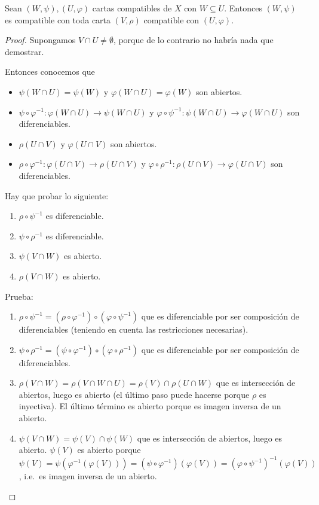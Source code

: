\documentclass[../VD.tex]{subfiles}
\begin{document}
\begin{lemma}
  \label{lem:compat-subcartas}
  Sean \((W,\psi), (U,\varphi)\) cartas compatibles de \(X\) con \(W \subseteq
  U\). Entonces \((W,\psi)\) es compatible con toda carta \((V,\rho)\)
  compatible con \((U,\varphi)\).
\end{lemma}

\begin{proof}
  Supongamos \(V \cap U \neq \emptyset\), porque de lo contrario no habría nada
  que demostrar.

  Entonces conocemos que
  \begin{itemize}
  \item \(\psi(W \cap U) = \psi(W)\) y \(\varphi(W \cap U) = \varphi(W)\) son
    abiertos.
  \item \(\psi \circ \varphi^{-1} \colon \varphi(W \cap U) \to \psi(W \cap U)\)
    y \(\varphi \circ \psi^{-1} \colon \psi(W \cap U) \to \varphi(W \cap U)\)
    son diferenciables.
  \item \(\rho(U \cap V)\) y \(\varphi(U \cap V)\) son abiertos.
  \item \(\rho \circ \varphi^{-1} \colon \varphi(U \cap V) \to \rho(U \cap V)\)
    y \(\varphi \circ \rho^{-1} \colon \rho(U \cap V) \to \varphi(U \cap V)\)
    son diferenciables.
  \end{itemize}

  Hay que probar lo siguiente:
  \begin{enumerate}
  \item \(\rho \circ \psi^{-1}\) es diferenciable.
  \item \(\psi \circ \rho^{-1}\) es diferenciable.
  \item \(\psi(V \cap W)\) es abierto.
  \item \(\rho(V \cap W)\) es abierto.
  \end{enumerate}

  Prueba:
  \begin{enumerate}
  \item \(\rho \circ \psi^{-1} = (\rho \circ \varphi^{-1}) \circ (\varphi \circ
    \psi^{-1})\) que es diferenciable por ser composición de diferenciables
    (teniendo en cuenta las restricciones necesarias).
  \item \(\psi \circ \rho^{-1} = (\psi \circ \varphi^{-1}) \circ (\varphi \circ
    \rho^{-1})\) que es diferenciable por ser composición de diferenciables.
  \item \(\rho(V \cap W) = \rho(V \cap W \cap U) = \rho(V) \cap \rho(U \cap W)\)
    que es intersección de abiertos, luego es abierto (el último paso puede
    hacerse porque \(\rho\) es inyectiva). El último término es abierto porque
    es imagen inversa de un abierto.
  \item \(\psi(V \cap W) = \psi(V) \cap \psi(W)\) que es intersección de
    abiertos, luego es abierto. \(\psi(V)\) es abierto porque \(\psi(V) =
    \psi{(\varphi^{-1}{(\varphi{(V)})})} = (\psi \circ \varphi^{-1}){(\varphi{(V)})} =
    {(\varphi \circ \psi^{-1})}^{-1}{(\varphi{(V)})}\), i.e.\ es imagen inversa de un abierto.
  \end{enumerate}
\end{proof}
\end{document}
